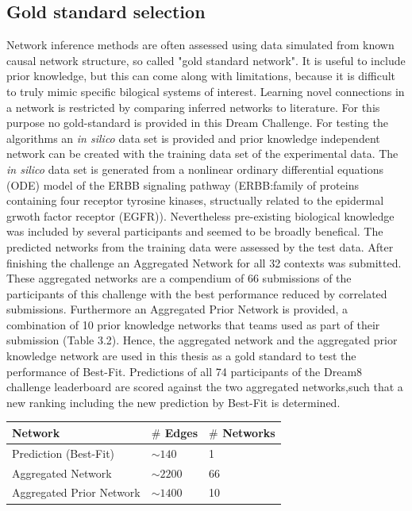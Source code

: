 \subsection*{Gold standard selection}
Network inference methods are often assessed using data simulated from known causal network structure, so called "gold standard network". It is useful to include prior knowledge, but this can come along with limitations, because it is difficult to truly mimic specific bilogical systems of interest. Learning novel connections in a network is restricted by comparing inferred networks to literature. For this purpose no gold-standard is provided in this Dream Challenge.  For testing the algorithms an \textit{in silico} data set is provided and prior knowledge independent network can be created with the training data set of the experimental data. The \textit{in silico} data set is generated from a nonlinear ordinary differential equations (ODE) model of the ERBB signaling pathway (ERBB:family of proteins containing four receptor tyrosine kinases, structually related to the epidermal grwoth factor receptor (EGFR)). Nevertheless pre-existing biological knowledge was included by several participants and seemed to be broadly benefical. The predicted networks from the training data were assessed by the test data.
After finishing the challenge an Aggregated Network for all 32 contexts was submitted. These aggregated networks are a compendium of 66 submissions of the participants of this challenge with the best performance reduced by correlated submissions.
Furthermore an Aggregated Prior Network is provided, a combination of 10 prior knowledge networks that teams used as part of their submission (Table 3.2). Hence, the aggregated network and the aggregated prior knowledge network are used in this thesis as a gold standard to test the performance of Best-Fit. Predictions of all 74 participants of the Dream8 challenge leaderboard are scored against the two aggregated networks,such that a new ranking including the new prediction by Best-Fit is determined.

\begin{table}[H]
\begin{center}
\begin{tabular}{l|l|l}
\toprule 
Network & $\# $ Edges & $\# $ Networks\\
 \hline\hline
Prediction (Best-Fit) & $\sim 140$ & 1\\
\rowcolor{black!10} Aggregated Network & $\sim 2200 $ & 66\\
Aggregated Prior Network & $\sim 1400$ & 10\\
\bottomrule
\end{tabular}
\end{center}
\end{table} 



